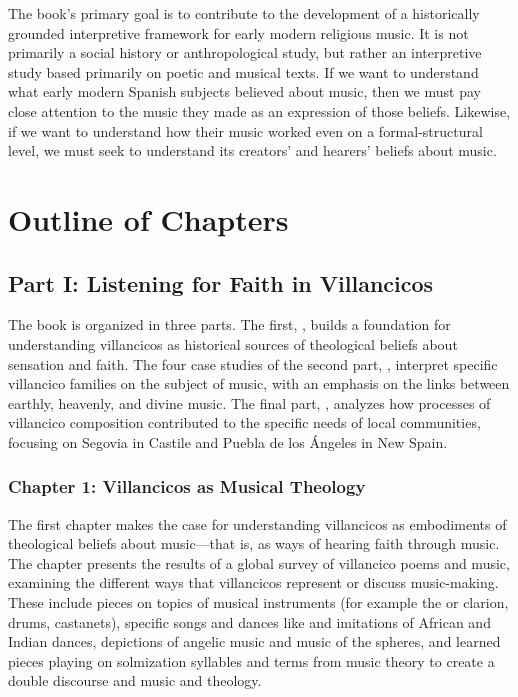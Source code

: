 \documentclass[tt]{vcbook-proposal}
\begin{document}
The book's primary goal is to contribute to the development of a historically grounded interpretive framework for early modern religious music.
It is not primarily a social history or anthropological study, but rather an interpretive study based primarily on poetic and musical texts.
If we want to understand what early modern Spanish subjects believed about music, then we must pay close attention to the music they made as an expression of those beliefs.
Likewise, if we want to understand how their music worked even on a formal-structural level, we must seek to understand its creators' and hearers' beliefs about music.


\section{Outline of Chapters}

\subsection{Part I: Listening for Faith in Villancicos}

The book is organized in three parts.
The first, , builds a foundation for understanding villancicos as historical sources of theological beliefs about sensation and faith.
The four case studies of the second part, , interpret specific villancico families on the subject of music, with an emphasis on the links between earthly, heavenly, and divine music.
The final part, , analyzes how processes of villancico composition contributed to the specific needs of local communities, focusing on Segovia in Castile and Puebla de los Ángeles in New Spain.

\subsubsection{Chapter 1: Villancicos as Musical Theology}

The first chapter makes the case for understanding villancicos as embodiments of theological beliefs about music---that is, as ways of hearing faith through music.
The chapter presents the results of a global survey of villancico poems and music, examining the different ways that villancicos represent or discuss music-making.
These include pieces on topics of musical instruments (for example the  or clarion, drums, castanets), specific songs and dances like  and imitations of African and Indian dances, depictions of angelic music and music of the spheres, and learned pieces playing on solmization syllables and terms from music theory to create a double discourse and music and theology.
\end{document}
